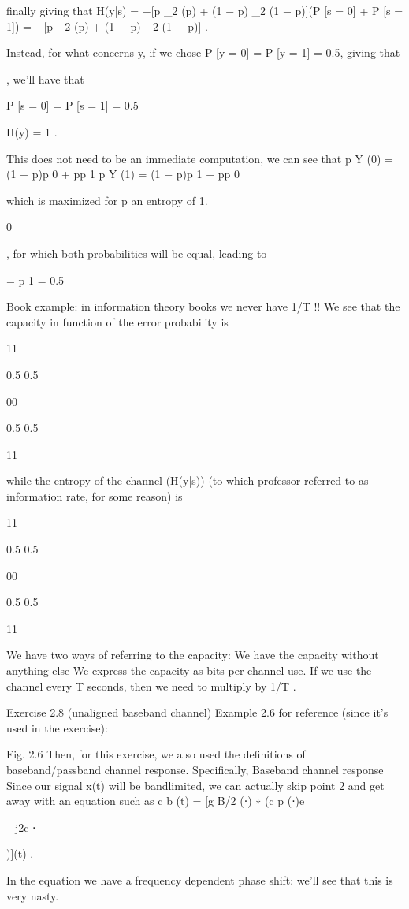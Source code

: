{{{finally giving that H(y|s) = −[p \log_2 (p) + (1 − p) \log_2 (1 − p)](P [s = 0] + P [s = 1])
= −[p \log_2 (p) + (1 − p) \log_2 (1 − p)] .

Instead, for what concerns y, if we chose P [y = 0] = P [y = 1] = 0.5, giving that

, we'll have that

P [s = 0] = P [s = 1] = 0.5

H(y) = 1 .

This does not need to be an immediate computation, we can see that p Y (0) = (1 − p)p 0 + pp 1 p Y (1) = (1 − p)p 1 + pp 0

which is maximized for p an entropy of 1.

0

, for which both probabilities will be equal, leading to

= p 1 = 0.5

Book example: in information theory books we never have 1/T !!
We see that the capacity in function of the error probability is

11

0.5 0.5

00

0.5 0.5

11

while the entropy of the channel (H(y|s)) (to which professor referred to as information rate, for some reason) is

11

0.5 0.5

00

0.5 0.5

11

We have two ways of referring to the capacity:
We have the capacity without anything else We express the capacity as bits per channel use.
If we use the channel every T seconds, then we need to multiply by 1/T .

Exercise 2.8 (unaligned baseband channel)
Example 2.6 for reference (since it's used in the exercise):

Fig. 2.6 Then, for this exercise, we also used the definitions of baseband/passband channel response.
Specifically,
Baseband channel response Since our signal x(t) will be bandlimited, we can actually skip point 2 and get away with an equation such as c b (t) = [g B/2 (⋅) ∗ (c p (⋅)e

−j2\pif c ⋅

)](t) .

In the equation we have a frequency dependent phase shift: we'll see that this is very nasty.

}}}
